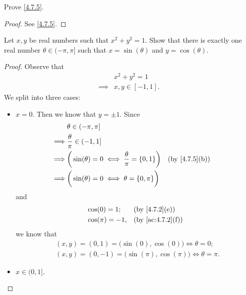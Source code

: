 \begin{ex}\label{ex:4.7.3}
  Prove \cref{4.7.5}.
\end{ex}

\begin{proof}
  See \cref{4.7.5}.
\end{proof}

\begin{ex}\label{ex:4.7.4}
  Let \(x, y\) be real numbers such that \(x^2 + y^2 = 1\).
  Show that there is exactly one real number \(\theta \in (-\pi, \pi]\) such that \(x = \sin(\theta)\) and \(y = \cos(\theta)\).
\end{ex}

\begin{proof}
  Observe that
  \begin{align*}
             & x^2 + y^2 = 1     \\
    \implies & x, y \in [-1, 1].
  \end{align*}
  We split into three cases:
  \begin{itemize}
    \item \(x = 0\).
          Then we know that \(y = \pm 1\).
          Since
          \begin{align*}
                     & \theta \in (-\pi, \pi]                                                                            \\
            \implies & \dfrac{\theta}{\pi} \in (-1, 1]                                                                   \\
            \implies & \bigg(\sin(\theta) = 0 \iff \dfrac{\theta}{\pi} = \{0, 1\}\bigg) &  & \text{(by \cref{4.7.5}(b))} \\
            \implies & \bigg(\sin(\theta) = 0 \iff \theta = \{0, \pi\}\bigg)
          \end{align*}
          and
          \begin{align*}
             & \cos(0) = 1;    &  & \text{(by \cref{4.7.2}(e))}    \\
             & \cos(\pi) = -1, &  & \text{(by \cref{ac:4.7.2}(f))}
          \end{align*}
          we know that
          \begin{align*}
             & (x, y) = (0, 1) = \big(\sin(0), \cos(0)\big) \iff \theta = 0;        \\
             & (x, y) = (0, -1) = \big(\sin(\pi), \cos(\pi)\big) \iff \theta = \pi.
          \end{align*}
    \item \(x \in (0, 1]\).

\end{itemize}
\end{proof}
